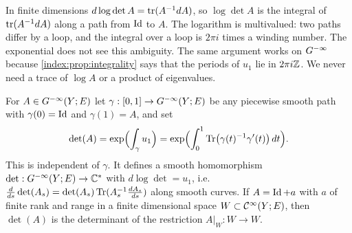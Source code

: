 \begin{discussion}
  In finite dimensions $d\log\det A=\operatorname{tr}(A^{-1}dA)$, so $\log\det A$ is the
  integral of $\operatorname{tr}(A^{-1}dA)$ along a path from $\operatorname{Id}$ to $A$. The logarithm is
  multivalued: two paths differ by a loop, and the integral over a loop is
  $2\pi i$ times a winding number. The exponential does not see this ambiguity.
  The same argument works on $G^{-\infty}$ because \cref{index:prop:integrality} says
  that the periods of $u_1$ lie in $2\pi i\mathbb{Z}$. We never need a trace of
  $\log A$ or a product of eigenvalues.
\end{discussion}

\begin{theorem}\label{index:thm:det}
  For $A\in G^{-\infty}(Y;E)$ let $\gamma:[0,1]\to G^{-\infty}(Y;E)$ be any piecewise smooth
  path with $\gamma(0)=\operatorname{Id}$ and $\gamma(1)=A$, and set
  \begin{equation}\label{index:eq:det}
    \det(A)=\exp\Bigl(\int_\gamma u_1\Bigr)=\exp\Bigl(\int_0^1
    \operatorname{Tr}\bigl(\gamma(t)^{-1}\gamma'(t)\bigr)\,dt\Bigr).
  \end{equation}
  This is independent of $\gamma$. It defines a smooth homomorphism
  $\det:G^{-\infty}(Y;E)\to\mathbb{C}^*$ with $d\log\det=u_1$, i.e.\
  $\frac{d}{ds}\det(A_s)=\det(A_s)\operatorname{Tr}(A_s^{-1}\frac{dA_s}{ds})$ along smooth
  curves. If $A=\operatorname{Id}+a$ with $a$ of finite rank and range in a finite
  dimensional space $W\subset\mathcal{C}^\infty(Y;E)$, then $\det(A)$ is the determinant of
  the restriction $A|_W:W\to W$.
\end{theorem}
